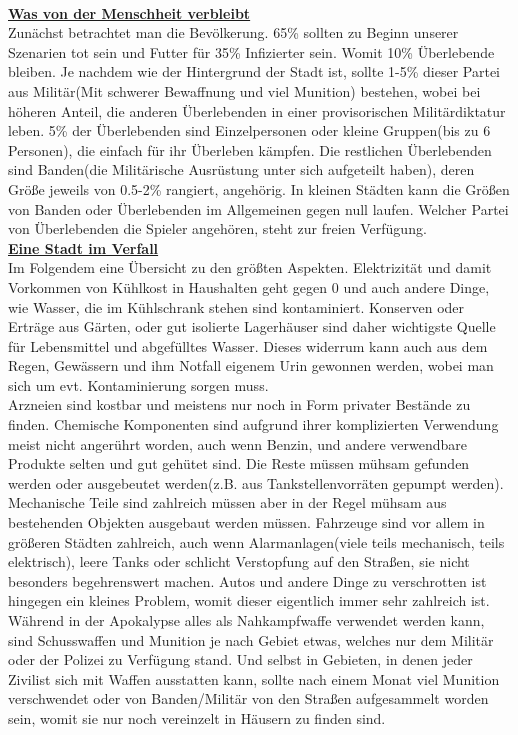 \documentclass[twoside,a4paper]{minimal}
\begin{document}
\begin{multicols*}{3}
\textbf{\uline{\\Was von der Menschheit verbleibt}}
\\Zunächst betrachtet man die Bevölkerung. 65\% sollten zu Beginn unserer Szenarien tot sein und Futter für 35\% Infizierter sein. Womit 10\% Überlebende bleiben. Je nachdem wie der Hintergrund der Stadt ist, sollte 1-5\% dieser Partei aus Militär(Mit schwerer Bewaffnung und viel Munition) bestehen, wobei bei höheren Anteil, die anderen Überlebenden in einer provisorischen Militärdiktatur leben. 5\% der Überlebenden sind Einzelpersonen oder kleine Gruppen(bis zu 6 Personen), die einfach für ihr Überleben kämpfen. Die restlichen Überlebenden sind Banden(die Militärische Ausrüstung unter sich aufgeteilt haben), deren Größe jeweils von 0.5-2\% rangiert, angehörig. In kleinen Städten kann die Größen von Banden oder Überlebenden im Allgemeinen gegen null laufen. Welcher Partei von Überlebenden die Spieler angehören, steht zur freien Verfügung.
\textbf{\uline{\\Eine Stadt im Verfall}}
\\Im Folgendem eine Übersicht zu den größten Aspekten. Elektrizität und damit Vorkommen von Kühlkost in Haushalten geht gegen 0 und auch andere Dinge, wie Wasser, die im Kühlschrank stehen sind kontaminiert. Konserven oder Erträge aus Gärten, oder gut isolierte Lagerhäuser sind daher wichtigste Quelle für Lebensmittel und abgefülltes Wasser. Dieses widerrum kann auch aus dem Regen, Gewässern und ihm Notfall eigenem Urin gewonnen werden, wobei man sich um evt. Kontaminierung sorgen muss.
\\Arzneien sind kostbar und meistens nur noch in Form privater Bestände zu finden. Chemische Komponenten sind aufgrund ihrer komplizierten Verwendung meist nicht angerührt worden, auch wenn Benzin, und andere verwendbare Produkte selten und gut gehütet sind. Die Reste müssen mühsam gefunden werden oder ausgebeutet werden(z.B. aus Tankstellenvorräten gepumpt werden). 
\\Mechanische Teile sind zahlreich müssen aber in der Regel mühsam aus bestehenden Objekten ausgebaut werden müssen. Fahrzeuge sind vor allem in größeren Städten zahlreich, auch wenn Alarmanlagen(viele teils mechanisch, teils elektrisch), leere Tanks oder schlicht Verstopfung auf den Straßen, sie nicht besonders begehrenswert machen. Autos und andere Dinge zu verschrotten ist hingegen ein kleines Problem, womit dieser eigentlich immer sehr zahlreich ist.
\\Während in der Apokalypse alles als Nahkampfwaffe verwendet werden kann, sind Schusswaffen und Munition je nach Gebiet etwas, welches nur dem Militär oder der Polizei zu Verfügung stand. Und selbst in Gebieten, in denen jeder Zivilist sich mit Waffen ausstatten kann, sollte nach einem Monat viel Munition verschwendet oder von Banden/Militär von den Straßen aufgesammelt worden sein, womit sie nur noch vereinzelt in Häusern zu finden sind.

\end{multicols*}
\end{document}
